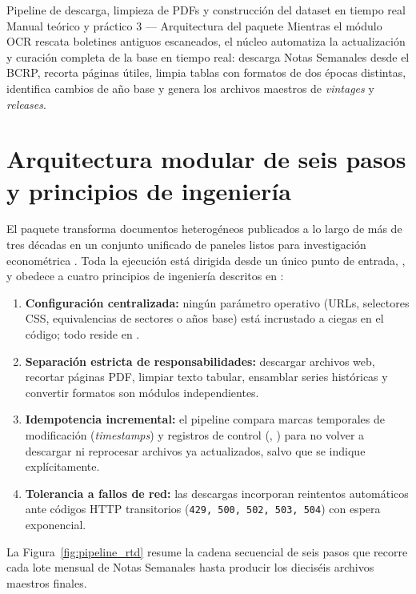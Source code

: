 \documentclass[12pt,letterpaper]{article}
\begin{document}
\apacabecera
  {Pipeline de descarga, limpieza de PDFs y construcción del dataset en tiempo real}
  {Manual teórico y práctico 3 — Arquitectura del paquete }
  {Mientras el módulo OCR rescata boletines antiguos escaneados, el núcleo  automatiza la actualización y curación completa de la base en tiempo real: descarga Notas Semanales desde el BCRP, recorta páginas útiles, limpia tablas con formatos de dos épocas distintas, identifica cambios de año base y genera los archivos maestros de \emph{vintages} y \emph{releases}.}

\section{Arquitectura modular de seis pasos y principios de ingeniería}

El paquete  transforma documentos heterogéneos publicados a lo largo de más de tres décadas en un conjunto unificado de paneles listos para investigación econométrica \parencite{cruz2025}. Toda la ejecución está dirigida desde un único punto de entrada, , y obedece a cuatro principios de ingeniería descritos en :
\begin{enumerate}
  \item \textbf{Configuración centralizada:} ningún parámetro operativo (URLs, selectores CSS, equivalencias de sectores o años base) está incrustado a ciegas en el código; todo reside en .
  \item \textbf{Separación estricta de responsabilidades:} descargar archivos web, recortar páginas PDF, limpiar texto tabular, ensamblar series históricas y convertir formatos son módulos independientes.
  \item \textbf{Idempotencia incremental:} el pipeline compara marcas temporales de modificación (\emph{timestamps}) y registros de control (, ) para no volver a descargar ni reprocesar archivos ya actualizados, salvo que se indique explícitamente.
  \item \textbf{Tolerancia a fallos de red:} las descargas incorporan reintentos automáticos ante códigos HTTP transitorios (\texttt{429, 500, 502, 503, 504}) con espera exponencial.
\end{enumerate}

La Figura~\ref{fig:pipeline_rtd} resume la cadena secuencial de seis pasos que recorre cada lote mensual de Notas Semanales hasta producir los dieciséis archivos maestros finales.
\end{document}
